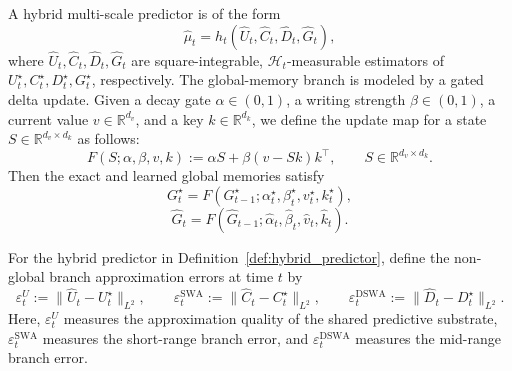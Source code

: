 \documentclass{llmxive}
\providecommand{\R}{\mathbb{R}}
\providecommand{\cH}{\mathcal{H}}
\begin{document}
\begin{definition}
\label{def:hybrid_predictor}
A hybrid multi-scale predictor is of the form
\begin{equation}
\hat\mu_t = h_t(\hat U_t,\hat C_t,\hat D_t,\hat G_t),
\label{eq:learned_predictor}
\end{equation}
where $\hat U_t,\hat C_t,\hat D_t,\hat G_t$ are square-integrable, $\cH_t$-measurable estimators of $U_t^\star,C_t^\star,D_t^\star,G_t^\star$, respectively. The global-memory branch is modeled by a gated delta update. Given a decay gate $\alpha \in (0, 1)$, a writing strength $\beta \in (0, 1)$, a current value $v \in \mathbb{R}^{d_v}$, and a key $k \in \mathbb{R}^{d_k}$, we define the update map for a state $S \in \mathbb{R}^{d_v \times d_k}$ as follows:
\begin{equation}
F(S;\alpha,\beta,v,k)
:=
\alpha S + \beta (v-Sk)k^\top,
\qquad
S\in\R^{d_v\times d_k}.
\label{eq:F_map}
\end{equation}
Then the exact and learned global memories satisfy
\begin{equation}
G_t^\star = F(G_{t-1}^\star;\alpha_t^\star,\beta_t^\star,v_t^\star,k_t^\star),
\label{eq:exact_G_update}
\end{equation}
\begin{equation}
\hat G_t = F(\hat G_{t-1};\hat\alpha_t,\hat\beta_t,\hat v_t,\hat k_t).
\label{eq:learned_G_update}
\end{equation}
\end{definition}





\begin{definition}
\label{def:branch_errors}
For the hybrid predictor in Definition~\ref{def:hybrid_predictor}, define the non-global branch
approximation errors at time $t$ by
\begin{equation}
\varepsilon_t^U := \|\hat U_t-U_t^\star\|_{L^2},\qquad
\varepsilon_t^{\mathrm{SWA}} := \|\hat C_t-C_t^\star\|_{L^2},\qquad
\varepsilon_t^{\mathrm{DSWA}} := \|\hat D_t-D_t^\star\|_{L^2}.
\label{eq:branch_error_defs}
\end{equation}
Here, $\varepsilon_t^U$ measures the approximation quality of the shared predictive substrate,
$\varepsilon_t^{\mathrm{SWA}}$ measures the short-range branch error, and
$\varepsilon_t^{\mathrm{DSWA}}$ measures the mid-range branch error.
\end{definition}
\end{document}
